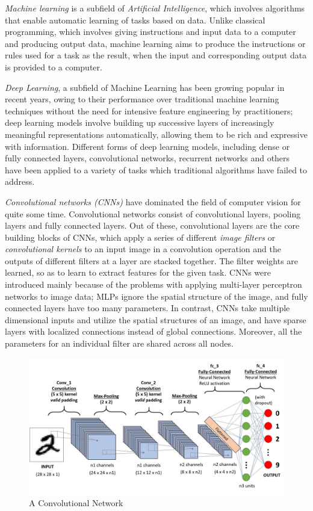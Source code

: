 
\par \textit{Machine learning} is a subfield of \textit{Artificial Intelligence}, which involves algorithms that enable automatic learning of tasks based on data. Unlike classical programming, which involves giving instructions and input data to a computer and producing output data, machine learning aims to produce the instructions or rules used for a task as the result, when the input and corresponding output data is provided to a computer.

\par \textit{Deep Learning}, a subfield of Machine Learning has been growing popular in recent years, owing to their performance over traditional machine learning techniques without the need for intensive feature engineering by practitioners; deep learning models involve building up successive layers of increasingly meaningful representations automatically, allowing them to be rich and expressive with information. Different forms of deep learning models, including dense or fully connected layers, convolutional networks, recurrent networks and others have been applied to a variety of tasks which traditional algorithms have failed to address.

\par \textit{Convolutional networks (CNNs)} have dominated the field of computer vision for quite some time. Convolutional networks consist of convolutional layers, pooling layers and fully connected layers. Out of these, convolutional layers are the core building blocks of CNNs, which apply a series of different \textit{image filters} or \textit{convolutional kernels} to an input image in a convolution operation and the outputs of different filters at a layer are stacked together. The filter weights are learned, so as to learn to extract features for the given task. CNNs were introduced mainly because of the problems with applying multi-layer perceptron networks to image data; MLPs ignore the spatial structure of the image, and fully connected layers have too many parameters. In contrast, CNNs take multiple dimensional inputs and utilize the spatial structures of an image, and have sparse layers with localized connections instead of global connections. Moreover, all the parameters for an individual filter are shared across all nodes.
\begin{figure}[h]
\centering
\includegraphics[width=\linewidth]{assets/img/cnn.jpeg}
\caption{A Convolutional Network}
\label{fig:cnn}
\end{figure}

